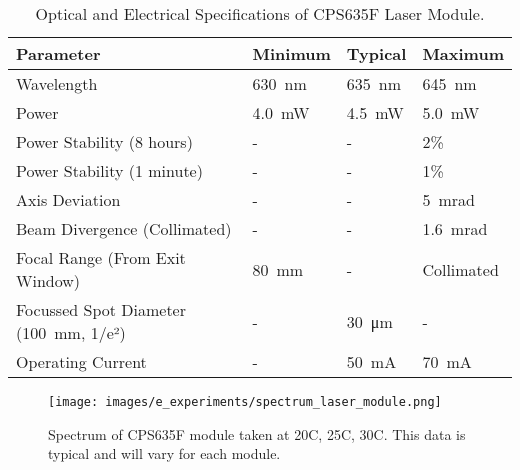 \begin{table}[h]
    \centering
    \footnotesize
    \renewcommand{\arraystretch}{1.2}
    \begin{tabular}{p{6cm}p{2cm}p{2cm}p{2cm}}
        \toprule
        \textbf{Parameter} & \textbf{Minimum} & \textbf{Typical} & \textbf{Maximum} \\
        \midrule
        Wavelength & \SI{630}{\nano\meter} & \SI{635}{\nano\meter} & \SI{645}{\nano\meter} \\
        Power & \SI{4.0}{\milli\watt} & \SI{4.5}{\milli\watt} & \SI{5.0}{\milli\watt} \\
        Power Stability (8 hours) & - & - & 2\% \\
        Power Stability (1 minute) & - & - & 1\% \\
        Axis Deviation & - & - & \SI{5}{\milli\radian} \\
        Beam Divergence (Collimated) & - & - & \SI{1.6}{\milli\radian} \\
        Focal Range (From Exit Window) & \SI{80}{\milli\meter} & - & Collimated \\
        Focussed Spot Diameter (\SI{100}{\milli\meter}, 1/e²) & - & \SI{30}{\micro\meter} & - \\ 
        Operating Current & - & \SI{50}{\milli\ampere} & \SI{70}{\milli\ampere} \\
        \bottomrule
    \end{tabular}
    \caption{Optical and Electrical Specifications of CPS635F Laser Module. \cite{thorlabs_laser}}
    \label{table:laser_module_specs}
\end{table}


\begin{figure}[h]
    \centering
    \texttt{[image: images/e\_experiments/spectrum\_laser\_module.png]}
    \caption{Spectrum of CPS635F module taken at 20\textdegree{}C, 25\textdegree{}C, 30\textdegree{}C. This data is typical and will vary for each module. \cite{thorlabs_laser}}
    \label{fig:spectrum_laser_module.png}
\end{figure}


